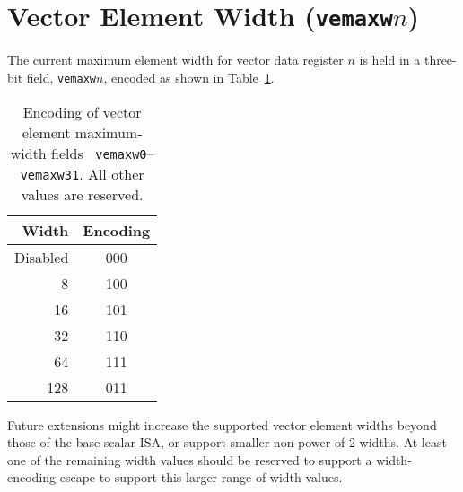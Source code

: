 \section{Vector Element Width ({\tt vemaxw}$n$)}

The current maximum element width for vector data register $n$ is held
in a three-bit field, {\tt vemaxw}$n$, encoded as shown in
Table~\ref{tab:vemaxw}.

\begin{table}[hbt]
  \centering
  \begin{tabular}{|r|c|}
    \hline
    Width & Encoding \\
    \hline
    Disabled  & 000 \\
    8         & 100  \\
    16        & 101  \\
    32        & 110  \\
    64        & 111  \\
    128       & 011  \\
    \hline
  \end{tabular}
  \caption{Encoding of vector element maximum-width fields {\tt
      vemaxw0}--{\tt vemaxw31}. All other values are reserved.}
  \label{tab:vemaxw}
\end{table}

\begin{commentary}
Future extensions might increase the supported vector element widths
beyond those of the base scalar ISA, or support smaller non-power-of-2
widths.  At least one of the remaining width values should be reserved
to support a width-encoding escape to support this larger range of
width values.
\end{commentary}


